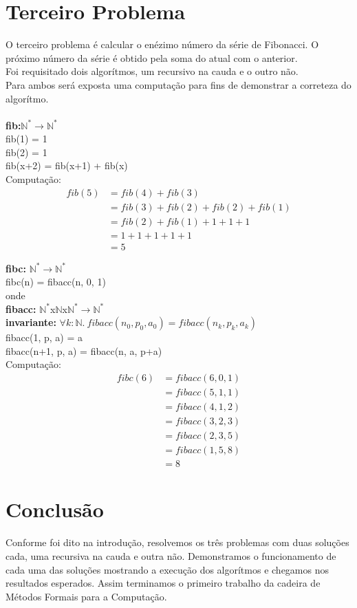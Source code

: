 \documentclass{article}
\begin{document}
\section{Terceiro Problema}
O terceiro problema é calcular o enézimo número da série de Fibonacci. O próximo número da série é obtido pela soma do atual com o anterior.\\
Foi requisitado dois algorítmos, um recursivo na cauda e o outro não.\\
Para ambos será exposta uma computação para fins de demonstrar a correteza do algorítmo.\\
\\
\textbf{fib:}$\mathbb{N}^* \rightarrow \mathbb{N}^*$\\
fib(1) = 1\\
fib(2) = 1\\
fib(x+2) = fib(x+1) + fib(x)\\
Computação:
\begin{align*}
fib(5) &= fib(4) + fib(3)\\
&= fib(3) + fib(2) + fib(2) + fib(1)\\
&= fib(2) + fib(1) + 1 + 1 + 1\\
&= 1 + 1 + 1 + 1 + 1\\
&= 5
\end{align*}

\noindent\textbf{fibc:} $\mathbb{N}^* \rightarrow \mathbb{N}^*$\\
fibc(n) = fibacc(n, 0, 1)\\
onde\\
\indent \textbf{fibacc:} $\mathbb{N}^*$x$\mathbb{N}$x$\mathbb{N}^* \rightarrow \mathbb{N}^*$\\
\indent \textbf{invariante:} $\forall k:\mathbb{N}.\: fibacc(n_0, p_0, a_0) = fibacc(n_k, p_k, a_k)$\\
\indent fibacc(1, p, a) = a\\
\indent fibacc(n+1, p, a) = fibacc(n, a, p+a)\\
Computação:
\begin{align*}
fibc(6) &= fibacc(6, 0, 1)\\
&= fibacc(5, 1, 1)\\
&= fibacc(4, 1, 2)\\
&= fibacc(3, 2, 3)\\
&= fibacc(2, 3, 5)\\
&= fibacc(1, 5, 8)\\
&= 8
\end{align*}

\section{Conclusão}
Conforme foi dito na introdução, resolvemos os três problemas com duas soluções cada, uma recursiva na cauda e outra não.
Demonstramos o funcionamento de cada uma das soluções mostrando a execução dos algorítmos e chegamos nos resultados esperados.
Assim terminamos o primeiro trabalho da cadeira de Métodos Formais para a Computação.
\end{document}
